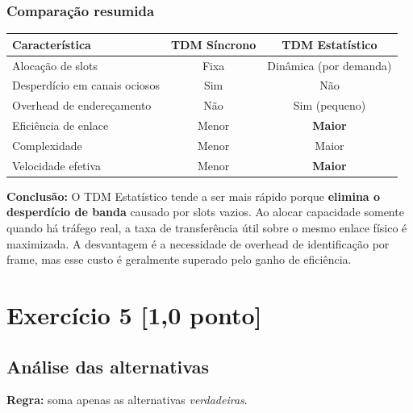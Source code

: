 \documentclass[12pt,a4paper]{article}
\begin{document}
\subsubsection*{Comparação resumida}

\begin{center}
\begin{tabular}{lcc}
\toprule
\textbf{Característica} & \textbf{TDM Síncrono} & \textbf{TDM Estatístico} \\
\midrule
Alocação de slots & Fixa & Dinâmica (por demanda) \\
Desperdício em canais ociosos & Sim & Não \\
Overhead de endereçamento & Não & Sim (pequeno) \\
Eficiência de enlace & Menor & \textbf{Maior} \\
Complexidade & Menor & Maior \\
Velocidade efetiva & Menor & \textbf{Maior} \\
\bottomrule
\end{tabular}
\end{center}

\begin{mdframed}[backgroundcolor=destaque!8]
\textbf{Conclusão:} O TDM Estatístico tende a ser mais rápido porque \textbf{elimina o desperdício de banda}
causado por slots vazios. Ao alocar capacidade somente quando há tráfego real, a taxa de transferência
útil sobre o mesmo enlace físico é maximizada. A desvantagem é a necessidade de overhead de identificação
por frame, mas esse custo é geralmente superado pelo ganho de eficiência.
\end{mdframed}

\vspace{1em}

\section*{Exercício 5 \hfill \normalfont\small[1,0 ponto]}

\subsection*{Análise das alternativas}

\begin{mdframed}[backgroundcolor=cinza, linewidth=0.5pt]
\textbf{Regra:} soma apenas as alternativas \textit{verdadeiras}.
\end{mdframed}
\end{document}

